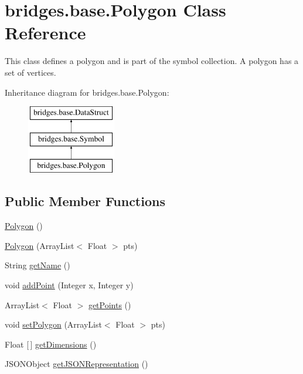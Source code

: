 \hypertarget{classbridges_1_1base_1_1_polygon}{}\section{bridges.\+base.\+Polygon Class Reference}
\label{classbridges_1_1base_1_1_polygon}


This class defines a polygon and is part of the symbol collection. A polygon has a set of vertices.  


Inheritance diagram for bridges.\+base.\+Polygon\+:\begin{figure}[H]
\begin{center}
\leavevmode
\includegraphics[height=3.000000cm]{classbridges_1_1base_1_1_polygon}
\end{center}
\end{figure}
\subsection*{Public Member Functions}
\begin{DoxyCompactItemize}
\item 
\mbox{\hyperlink{classbridges_1_1base_1_1_polygon_af0c1b3bc3147ffbda98fd9c515a8052d}{Polygon}} ()
\item 
\mbox{\hyperlink{classbridges_1_1base_1_1_polygon_a341cc297ba7f0f201d31aa3c98ecf108}{Polygon}} (Array\+List$<$ Float $>$ pts)
\item 
String \mbox{\hyperlink{classbridges_1_1base_1_1_polygon_a2203367acb1a26dfa1a81d69ce61274f}{get\+Name}} ()
\item 
void \mbox{\hyperlink{classbridges_1_1base_1_1_polygon_a23af8508f5ef7c2bbe0784264ee86e16}{add\+Point}} (Integer x, Integer y)
\item 
Array\+List$<$ Float $>$ \mbox{\hyperlink{classbridges_1_1base_1_1_polygon_adf81f52211ad3c2c8318461e199b6df5}{get\+Points}} ()
\item 
void \mbox{\hyperlink{classbridges_1_1base_1_1_polygon_ac92747578a038f747de9b2ccc90dc972}{set\+Polygon}} (Array\+List$<$ Float $>$ pts)
\item 
Float \mbox{[}$\,$\mbox{]} \mbox{\hyperlink{classbridges_1_1base_1_1_polygon_ae6e7440de0d3de9084f924e08f515a67}{get\+Dimensions}} ()
\item 
J\+S\+O\+N\+Object \mbox{\hyperlink{classbridges_1_1base_1_1_polygon_a12489d762f32ce5259ae6640ad95f188}{get\+J\+S\+O\+N\+Representation}} ()
\end{DoxyCompactItemize}
